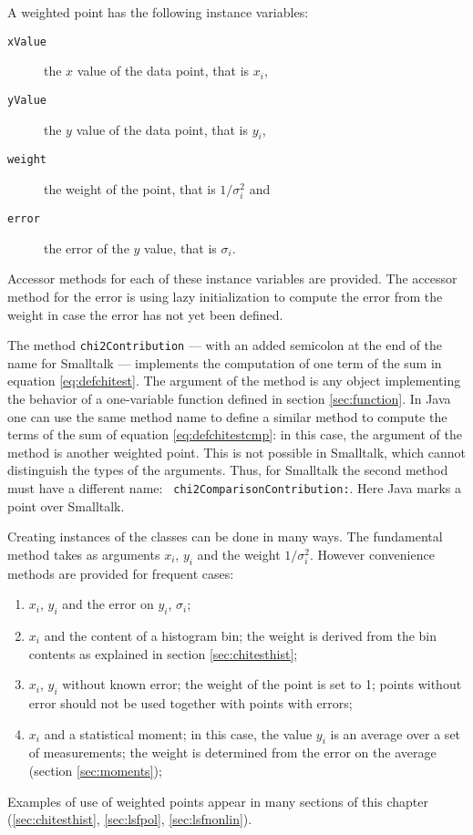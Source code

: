 \documentclass[twoside]{book}
\begin{document}
\noindent A weighted point has the following instance variables:
\begin{description}
  \item[\tt xValue] the $x$ value of the data point, that is $x_i$,
  \item[\tt yValue] the $y$ value of the data point, that is $y_i$,
  \item[\tt weight] the weight of the point, that is $1/\sigma_i^2$
  and
  \item[\tt error] the error of the $y$ value, that is $\sigma_i$.
\end{description}
Accessor methods for each of these instance variables are
provided. The accessor method for the error is using lazy
initialization to compute the error from the weight in case the
error has not yet been defined.

The method {\tt chi2Contribution} --- with an added semicolon at
the end of the name for Smalltalk --- implements the computation
of one term of the sum in equation \ref{eq:defchitest}. The
argument of the method is any object implementing the behavior of
a one-variable function defined in section \ref{sec:function}. In
Java one can use the same method name to define a similar method
to compute the terms of the sum of equation
\ref{eq:defchitestcmp}: in this case, the argument of the method
is another weighted point. This is not possible in Smalltalk,
which cannot distinguish the types of the arguments. Thus, for
Smalltalk the second method must have a different name: {\tt
chi2ComparisonContribution:}. Here Java marks a point over
Smalltalk.

Creating instances of the classes can be done in many ways. The
fundamental method takes as arguments $x_i$, $y_i$ and the weight
$1/\sigma_i^2$. However convenience methods are provided for
frequent cases:
\begin{enumerate}
  \item $x_i$, $y_i$ and the error on $y_i$, $\sigma_i$;
  \item $x_i$ and the content of a histogram bin; the weight is derived
  from the bin contents as explained in section \ref{sec:chitesthist};
  \item $x_i$, $y_i$ without known error; the weight of the point is set to
  1; points without error should not be used together with points
  with errors;
  \item $x_i$ and a statistical moment; in this case, the value $y_i$
  is an average over a set of measurements; the weight is determined
  from the error on the average (\cf section \ref{sec:moments});
\end{enumerate}
Examples of use of weighted points appear in many sections of this
chapter (\ref{sec:chitesthist}, \ref{sec:lsfpol},
\ref{sec:lsfnonlin}).
\end{document}
